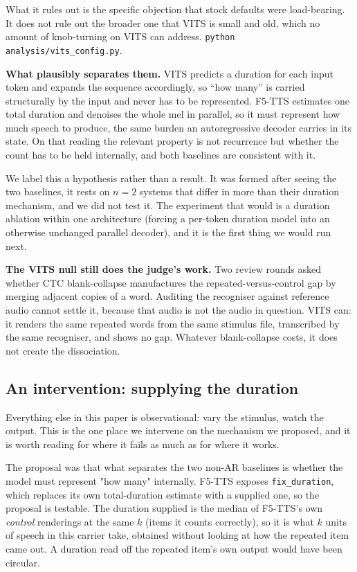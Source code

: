 \documentclass[11pt]{article}
\begin{document}
What it rules out is the specific objection that stock defaults were
load-bearing. It does not rule out the broader one that VITS is small and old,
which no amount of knob-turning on VITS can address.
\texttt{python analysis/vits\_config.py}.

\noindent\textbf{What plausibly separates them.} VITS predicts a duration for
each input token and expands the sequence accordingly, so ``how many'' is carried
structurally by the input and never has to be represented. F5-TTS estimates one
total duration and denoises the whole mel in parallel, so it must represent how
much speech to produce, the same burden an autoregressive decoder carries in
its state. On that reading the relevant property is not recurrence but whether
the count has to be held internally, and both baselines are consistent with it.

We label this a hypothesis rather than a result. It was formed after seeing the
two baselines, it rests on $n=2$ systems that differ in more than their duration
mechanism, and we did not test it. The experiment that would is a duration
ablation within one architecture (forcing a per-token duration model into an
otherwise unchanged parallel decoder), and it is the first thing we would run
next.

\noindent\textbf{The VITS null still does the judge's work.} Two review rounds
asked whether CTC blank-collapse manufactures the repeated-versus-control gap by
merging adjacent copies of a word. Auditing the recogniser against reference
audio cannot settle it, because that audio is not the audio in question. VITS
can: it renders the same repeated words from the same stimulus file, transcribed
by the same recogniser, and shows no gap. Whatever blank-collapse costs, it does
not create the dissociation.

\subsection{An intervention: supplying the duration}
\label{sec:s13-dur}

Everything else in this paper is observational: vary the stimulus, watch the
output. This is the one place we intervene on the mechanism we proposed, and it
is worth reading for where it fails as much as for where it works.

The proposal was that what separates the two non-AR baselines is whether the
model must represent "how many" internally. F5-TTS exposes \texttt{fix\_duration}, which
replaces its own total-duration estimate with a supplied one, so the proposal is
testable. The duration supplied is the median of F5-TTS's own \emph{control}
renderings at the same $k$ (items it counts correctly), so it is what $k$
units of speech in this carrier take, obtained without looking at how the
repeated item came out. A duration read off the repeated item's own output would
have been circular.
\end{document}

